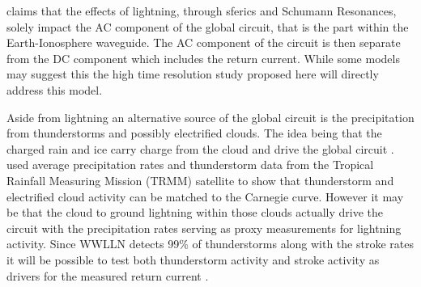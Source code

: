 \documentclass[12pt, letterpaper, onecolumn, oneside]{article}
\begin{document}
\citet{Rycroft2008} claims that the effects of lightning, through sferics and Schumann Resonances, solely impact the AC component of the global circuit, that is the part within the Earth-Ionosphere waveguide. The AC component of the circuit is then separate from the DC component which includes the return current. While some models may suggest this the high time resolution study proposed here will directly address this model.

Aside from lightning an alternative source of the global circuit is the precipitation from thunderstorms and possibly electrified clouds. The idea being that the charged rain and ice carry charge from the cloud and drive the global circuit \citep{Rycroft2008}. \citet{Liu2010} used average precipitation rates and thunderstorm data from the Tropical Rainfall Measuring Mission (TRMM) satellite to show that thunderstorm and electrified cloud activity can be matched to the Carnegie curve. However it may be that the cloud to ground lightning within those clouds actually drive the circuit with the precipitation rates serving as proxy measurements for lightning activity. Since WWLLN detects 99\% of thunderstorms along with the stroke rates it will be possible to test both thunderstorm activity and stroke activity as drivers for the measured return current \citep{Jacobson2006c}.

%
%
%
%
%
%
%
%
%
\end{document}

